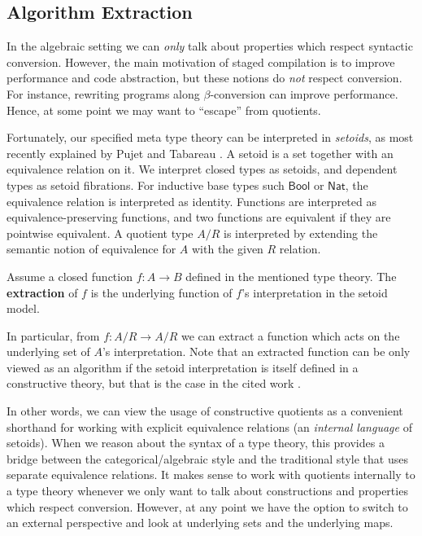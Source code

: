 \documentclass[acmsmall,anonymous,review]{acmart}
\newcommand{\msf}[1]{\mathsf{#1}}
\newcommand{\Bool}{\msf{Bool}}
\newcommand{\Nat}{\msf{Nat}}
\theoremstyle{remark}
\begin{document}
\subsection{Algorithm Extraction}

In the algebraic setting we can \emph{only} talk about properties which
respect syntactic conversion. However, the main motivation of staged compilation is to
improve performance and code abstraction, but these notions do \emph{not}
respect conversion. For instance, rewriting programs along $\beta$-conversion
can improve performance. Hence, at some point we may want to ``escape'' from
quotients.

Fortunately, our specified meta type theory can be interpreted in
\emph{setoids}, as most recently explained by Pujet and Tabareau
\cite{DBLP:journals/pacmpl/PujetT22}. A setoid is a set together with an
equivalence relation on it. We interpret closed types as setoids, and
dependent types as setoid fibrations. For inductive base types such $\Bool$ or
$\Nat$, the equivalence relation is interpreted as identity. Functions are
interpreted as equivalence-preserving functions, and two functions are equivalent if
they are pointwise equivalent. A quotient type $A/R$ is interpreted by extending
the semantic notion of equivalence for $A$ with the given $R$ relation.

\begin{definition} Assume a closed function $f : A \to B$ defined
in the mentioned type theory. The \textbf{extraction} of $f$ is
the underlying function of $f$'s interpretation in the setoid model.
\end{definition}

In particular, from $f : A/R \to A/R$ we can extract a function which acts on
the underlying set of $A$'s interpretation. Note that an extracted function can
be only viewed as an algorithm if the setoid interpretation is itself defined in
a constructive theory, but that is the case in the cited work
\cite{DBLP:journals/pacmpl/PujetT22}.

In other words, we can view the usage of constructive quotients as a convenient
shorthand for working with explicit equivalence relations (an \emph{internal
language} of setoids). When we reason about the syntax of a type theory, this
provides a bridge between the categorical/algebraic style and the traditional
style that uses separate equivalence relations. It makes sense to work with
quotients internally to a type theory whenever we only want to talk about
constructions and properties which respect conversion. However, at any point we
have the option to switch to an external perspective and look at underlying sets
and the underlying maps.
\end{document}
